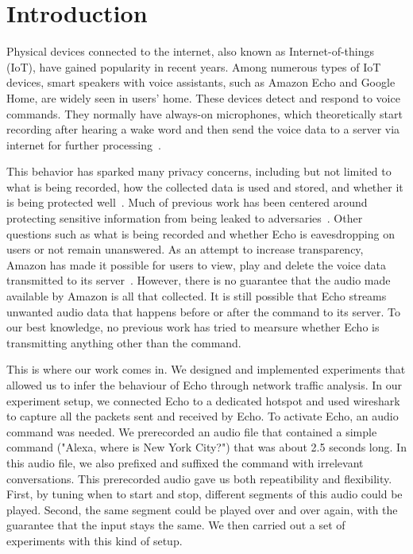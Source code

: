\section{Introduction}
Physical devices connected to the internet, also known as Internet-of-things (IoT), have gained popularity in recent years. Among numerous types of IoT devices, smart speakers with voice assistants, such as Amazon Echo and Google Home, are widely seen in users' home. These devices detect and respond to voice commands. They normally have always-on microphones, which theoretically start recording after hearing a wake word and then send the voice data to a server via internet for further processing~\cite{AmazonEc68:online}.

This behavior has sparked many privacy concerns, including but not limited to what is being recorded, how the collected data is used and stored, and whether it is being protected well~\cite{lau2018alexa, fowler_2019, apthorpe2017smart, apthorpe2019keeping, apthorpe2017spying}. Much of previous work has been centered around protecting sensitive information from being leaked to adversaries~\cite{apthorpe2017smart, apthorpe2019keeping, apthorpe2017spying}. Other questions such as what is being recorded and whether Echo is eavesdropping on users or not remain unanswered. As an attempt to increase transparency, Amazon has made it possible for users to view, play and delete the voice data transmitted to its server~\cite{ford2019alexa}. However, there is no guarantee that the audio made available by Amazon is all that collected. It is still possible that Echo streams unwanted audio data that happens before or after the command to its server. To our best knowledge, no previous work has tried to mearsure whether Echo is transmitting anything other than the command.

This is where our work comes in. We designed and implemented experiments that allowed us to infer the behaviour of Echo through network traffic analysis. In our experiment setup, we connected Echo to a dedicated hotspot and used wireshark to capture all the packets sent and received by Echo. To activate Echo, an audio command was needed. We prerecorded an audio file that contained a simple command ("Alexa, where is New York City?") that was about 2.5 seconds long. In this audio file, we also prefixed and suffixed the command with irrelevant conversations. This prerecorded audio gave us both repeatibility and flexibility. First, by tuning when to start and stop, different segments of this audio could be played. Second, the same segment could be played over and over again, with the guarantee that the input stays the same. We then carried out a set of experiments with this kind of setup.

